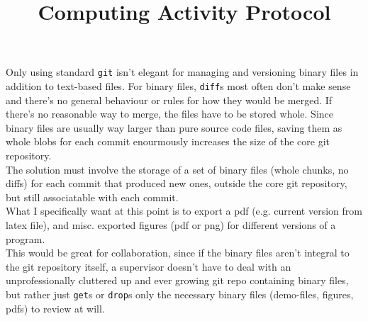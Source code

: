 \documentclass[12pt]{article}
\newenvironment{problem}[2][Problem]{\begin{trivlist}
\item[\hskip \labelsep {\bfseries #1}\hskip \labelsep {\bfseries #2.}]}{\end{trivlist}}
\begin{document}
\title{\vspace{-2cm}Computing Activity Protocol}
\maketitle

\begin{problem}{1}
    Only using standard \texttt{git} isn't elegant for managing and versioning binary files in addition to text-based files. For binary files, \texttt{diff}s most often don't make sense and there's no general behaviour or rules for how they would be merged. If there's no reasonable way to merge, the files have to be stored whole. Since binary files are usually way larger than pure source code files, saving them as whole blobs for each commit enourmously increases the size of the core git repository. \\ The solution must involve the storage of a set of binary files (whole chunks, no diffs) for each commit that produced new ones, outside the core git repository, but still associatable with each commit. \\
What I specifically want at this point is to export a pdf (e.g. current version from latex file), and misc. exported figures (pdf or png) for different versions of a program. \\ This would be great for collaboration, since if the binary files aren't integral to the git repository itself, a supervisor doesn't have to deal with an unprofessionally cluttered up and ever growing git repo containing binary files, but rather just \texttt{get}s or \texttt{drop}s only the necessary binary files (demo-files, figures, pdfs) to review at will. 
\end{problem}
\end{document}
